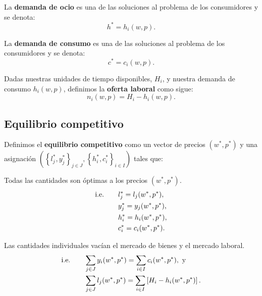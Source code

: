 \documentclass[8pt,a4paper]{extarticle}
\begin{document}
\begin{multicols}{3}
\sectionbreak

\begin{boxdef}
	La \textbf{demanda de ocio} es una de las soluciones al problema de los consumidores y se denota:
	\[
		h^* = h_i(w, p)
	.\] 
\end{boxdef}

\begin{boxdef}
	La \textbf{demanda de consumo} es una de las soluciones al problema de los consumidores y se denota:
	\[
		c^* = c_i(w, p)
	.\] 
\end{boxdef}

\begin{boxdef}
	Dadas nuestras unidades de tiempo disponibles, $H_i$, y nuestra demanda de consumo $h_i(w, p)$, definimos la \textbf{oferta laboral} como sigue:
	\[
		n_i(w, p) = H_i - h_i(w, p)
	.\] 
\end{boxdef}

\subsection{Equilibrio competitivo}

\begin{boxdef}
	Definimos el \textbf{equilibrio competitivo} como un vector de precios $(w^*, p^*)$ y una asignación $\left( \left\{ l^*_j, y^*_j \right\}_{j \in J}, \left\{ h^*_i, c^*_i \right\}_{i \in I} \right)$ tales que:
	\begin{eqlist}
	\item Todas las cantidades son óptimas a los precios $(w^*, p^*)$.
		\begin{equation*}
			\begin{aligned}
				\text{\normalfont i.e.} \qquad & l^*_j = l_j(w^*, p^*), \\
				           & y^*_j = y_j(w^*, p^*), \\
						   & h^*_i = h_i(w^*, p^*), \\
					       & c^*_i = c_i(w^*, p^*).
			\end{aligned}
		\end{equation*}
	\item Las cantidades individuales vacían el mercado de bienes y el mercado laboral.
		\begin{equation*}
			\begin{aligned}
				\text{\normalfont i.e.} \qquad & \sum_{j \in J} y_i(w^*, p^*) = \sum_{i \in I} c_i(w^*, p^*),\ \text{y} \\
						   & \sum_{j \in J} l_j(w^*, p^*) = \sum_{i \in I} \left[ H_i - h_i(w^*, p^*) \right].
			\end{aligned}
		\end{equation*}
	\end{eqlist}
\end{boxdef}


\end{multicols}
\end{document}
